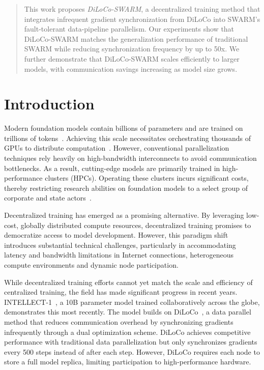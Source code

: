 \documentclass{article}
\begin{document}
\begin{abstract}
  This work proposes \textit{DiLoCo-SWARM}, a decentralized training method that integrates infrequent gradient synchronization from DiLoCo into SWARM's fault-tolerant data-pipeline parallelism. Our experiments show that DiLoCo-SWARM matches the generalization performance of traditional SWARM while reducing synchronization frequency by up to 50x. We further demonstrate that DiLoCo-SWARM scales efficiently to larger models, with communication savings increasing as model size grows.
\end{abstract}

\section{Introduction}

Modern foundation models contain billions of parameters and are trained on trillions of tokens~\cite{chowdhery2022palm,brown2023gpt3,dubey2024llama3,google2024gemini}. Achieving this scale necessitates orchestrating thousands of GPUs to distribute computation~\cite{dubey2024llama3,deepseekai2024}. However, conventional parallelization techniques rely heavily on high-bandwidth interconnects to avoid communication bottlenecks. As a result, cutting-edge models are primarily trained in high-performance clusters (HPCs). Operating these clusters incurs significant costs, thereby restricting research abilities on foundation models to a select group of corporate and state actors~\cite{jaghouar2024intellect1}.

Decentralized training has emerged as a promising alternative. By leveraging low-cost, globally distributed compute resources, decentralized training promises to democratize access to model development. However, this paradigm shift introduces substantial technical challenges, particularly in accommodating latency and bandwidth limitations in Internet connections, heterogeneous compute environments and dynamic node participation.

While decentralized training efforts cannot yet match the 
scale and efficiency of centralized training, the field 
has made significant progress in recent years. INTELLECT-1~\cite{jaghouar2024intellect1}, a 10B parameter model trained collaboratively across the globe, demonstrates this most recently. The model builds on DiLoCo~\cite{douillard2023diloco}, a data parallel method that reduces communication overhead by synchronizing gradients infrequently through a dual optimization scheme. DiLoCo achieves competitive performance with traditional data parallelization but only synchronizes gradients every 500 steps instead of after each step. However, DiLoCo requires each node to store a full model replica, limiting participation to high-performance hardware.
\end{document}
